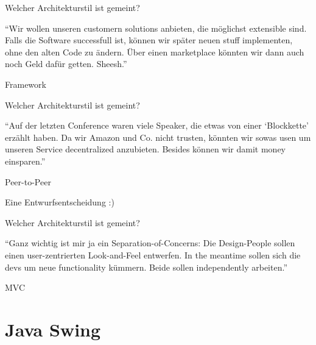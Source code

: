 \documentclass[18pt]{beamer}
\begin{document}
\begin{frame}{Welcher Architekturstil ist gemeint?}
	\begin{block}{}
		\enquote{Wir wollen unseren customern solutions anbieten, die möglichst extensible sind. Falls die Software successfull ist, können wir später neuen stuff implementen, ohne den alten Code zu ändern. Über einen marketplace könnten wir dann auch noch Geld dafür getten. Sheesh.}
	\end{block}
	\pause 
	Framework
\end{frame}

\begin{frame}{Welcher Architekturstil ist gemeint?}
	\begin{block}{}
	\enquote{Auf der letzten Conference waren viele Speaker, die etwas von einer \enquote{Blockkette} erzählt haben. Da wir Amazon und Co. nicht trusten, könnten wir sowas usen um unseren Service decentralized anzubieten. Besides können wir damit money einsparen.}
	\end{block}
	\pause
	Peer-to-Peer
\end{frame}

\begin{frame}{Eine Entwurfsentscheidung :)}
	\begin{figure}
		\centering
	\end{figure}

\end{frame}

\begin{frame}{Welcher Architekturstil ist gemeint?}
	\begin{block}{}
		\enquote{Ganz wichtig ist mir ja ein Separation-of-Concerns: Die Design-People sollen einen user-zentrierten Look-and-Feel entwerfen. In the meantime sollen sich die devs um neue functionality kümmern. Beide sollen independently arbeiten.}
	\end{block}
	\pause
	MVC
\end{frame}

\section{Java Swing}
\end{document}
